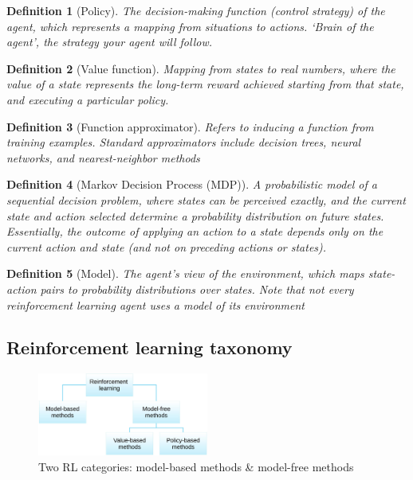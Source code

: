 \documentclass{article}
\newtheorem{theorem}{Definition}[section]
\begin{document}
\begin{theorem}[Policy]
    The decision-making function (control strategy) of the agent, which represents
    a mapping from situations to actions. `Brain of the agent', the strategy your agent will follow.
\end{theorem}

\begin{theorem}[Value function]
    Mapping from states to real numbers, where the value of a state represents
    the long-term reward achieved starting from that state, and executing a particular
    policy.
\end{theorem}

\begin{theorem}[Function approximator]
    Refers to inducing a function from training examples. Standard 
    approximators include decision trees, neural networks, 
    and nearest-neighbor methods
\end{theorem}

\begin{theorem}[Markov Decision Process (MDP)]
    A probabilistic model of a sequential decision problem, where
    states can be perceived exactly, and the current state and action selected determine a
    probability distribution on future states. Essentially, the outcome of applying an action to a
    state depends only on the current action and state (and not on preceding actions or states).
\end{theorem}

\begin{theorem}[Model]
    The agent's view of the environment, which maps state-action pairs to probability
    distributions over states. Note that not every reinforcement learning agent uses a model of its
    environment
\end{theorem}

\subsection{Reinforcement learning taxonomy}

\begin{figure}[H]
    \centering
    \includegraphics[width=0.5\textwidth]{img/rl-taxonomy.png}
    \caption{Two RL categories: model-based methods \& model-free methods}
\end{figure}
\end{document}
